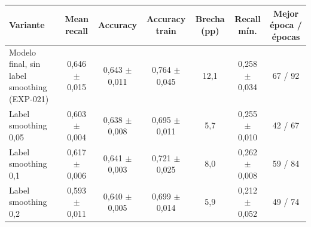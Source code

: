 \begin{tabular}{lcccccc}
\toprule
Variante & Mean recall & Accuracy & Accuracy train & Brecha (pp) & Recall mín. & Mejor época / épocas \\
\midrule
Modelo final, sin label smoothing (EXP-021) & 0,646 $\pm$ 0,015 & 0,643 $\pm$ 0,011 & 0,764 $\pm$ 0,045 & 12,1 & 0,258 $\pm$ 0,034 & 67 / 92 \\
Label smoothing 0,05 & 0,603 $\pm$ 0,004 & 0,638 $\pm$ 0,008 & 0,695 $\pm$ 0,011 & 5,7 & 0,255 $\pm$ 0,010 & 42 / 67 \\
Label smoothing 0,1 & 0,617 $\pm$ 0,006 & 0,641 $\pm$ 0,003 & 0,721 $\pm$ 0,025 & 8,0 & 0,262 $\pm$ 0,008 & 59 / 84 \\
Label smoothing 0,2 & 0,593 $\pm$ 0,011 & 0,640 $\pm$ 0,005 & 0,699 $\pm$ 0,014 & 5,9 & 0,212 $\pm$ 0,052 & 49 / 74 \\
\bottomrule
\end{tabular}
